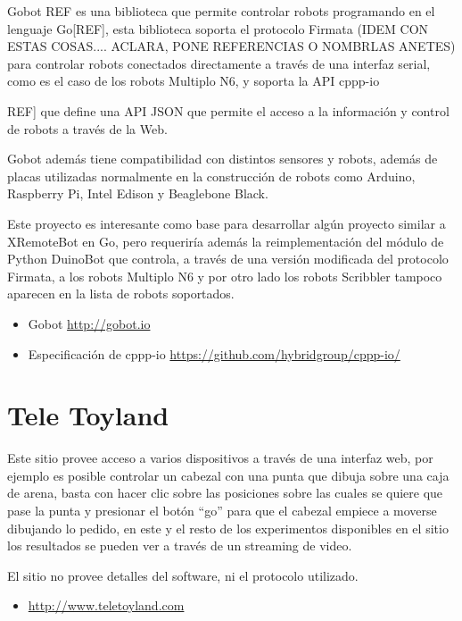 Gobot {REF} es una biblioteca que permite controlar robots programando en el lenguaje
Go[REF], esta biblioteca soporta el protocolo Firmata (IDEM CON ESTAS COSAS.... ACLARA, PONE REFERENCIAS O NOMBRLAS ANETES) para controlar robots
conectados directamente a través de una interfaz serial, como es el caso
de los robots Multiplo N6, y soporta la API cppp-io{REF] que define una API JSON
que permite el acceso a la información y control de robots a través de la Web.

Gobot además tiene compatibilidad con distintos sensores y robots, además de
placas utilizadas normalmente en la construcción de robots como Arduino,
Raspberry Pi, Intel Edison y Beaglebone Black.

Este proyecto es interesante como base para desarrollar algún proyecto
similar a XRemoteBot en Go, pero requeriría además la reimplementación
del módulo de Python DuinoBot que controla, a través de una versión
modificada del protocolo Firmata, a los robots Multiplo N6 y por otro
lado los robots Scribbler tampoco aparecen en la lista de robots soportados.

\begin{itemize}
    \item Gobot \url{http://gobot.io}
    \item Especificación de cppp-io \url{https://github.com/hybridgroup/cppp-io/}
\end{itemize}

\section{Tele Toyland}

Este sitio provee acceso a varios dispositivos a través de una interfaz web,
por ejemplo es posible controlar un cabezal con una punta que dibuja sobre
una caja de arena, basta con hacer clic sobre las posiciones sobre las cuales
se quiere que pase la punta y presionar el botón ``go'' para que el cabezal
empiece a moverse dibujando lo pedido, en este y el resto de los experimentos
disponibles en el sitio los resultados se pueden ver a través de un streaming
de video.

El sitio no provee detalles del software, ni el protocolo utilizado.

\begin{itemize}
    \item \url{http://www.teletoyland.com}
\end{itemize}

}
